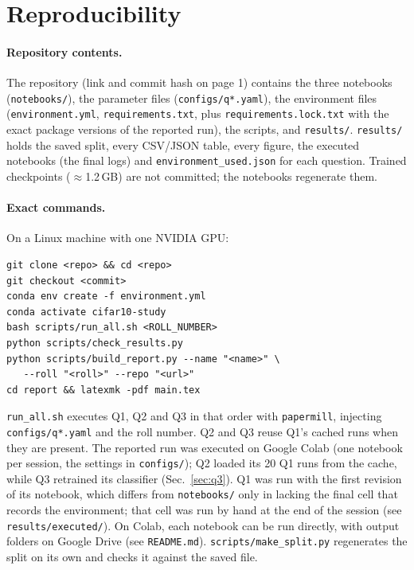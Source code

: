 \section{Reproducibility}
\label{sec:repro}

\paragraph{Repository contents.} The repository (link and commit hash on page 1) contains the three notebooks
(\texttt{notebooks/}), the parameter files (\texttt{configs/q*.yaml}), the environment files (\texttt{environment.yml},
\texttt{requirements.txt}, plus \texttt{requirements.lock.txt} with the exact package versions of the reported run), the scripts,
and \texttt{results/}. \texttt{results/} holds the saved split, every CSV/JSON table, every figure, the executed notebooks
(the final logs) and \texttt{environment\_used.json} for each question. Trained checkpoints ($\approx$1.2\,GB) are not committed;
the notebooks regenerate them.

\paragraph{Exact commands.} On a Linux machine with one NVIDIA GPU:
\begin{small}
\begin{verbatim}
git clone <repo> && cd <repo>
git checkout <commit>
conda env create -f environment.yml
conda activate cifar10-study
bash scripts/run_all.sh <ROLL_NUMBER>
python scripts/check_results.py
python scripts/build_report.py --name "<name>" \
   --roll "<roll>" --repo "<url>"
cd report && latexmk -pdf main.tex
\end{verbatim}
\end{small}
\texttt{run\_all.sh} executes Q1, Q2 and Q3 in that order with \texttt{papermill}, injecting \texttt{configs/q*.yaml} and the roll
number. Q2 and Q3 reuse Q1's cached runs when they are present. The reported run was executed on Google Colab
(one notebook per session, the settings in \texttt{configs/}); Q2 loaded its 20 Q1 runs from the cache, while Q3
retrained its classifier (Sec.~\ref{sec:q3}). Q1 was run with the first revision of its notebook, which differs from
\texttt{notebooks/} only in lacking the final cell that records the environment; that cell was run by hand at the end
of the session (see \texttt{results/executed/}). On Colab, each notebook can be run directly, with output folders on Google Drive (see
\texttt{README.md}). \texttt{scripts/make\_split.py} regenerates the split on its own and checks it against the saved file.

